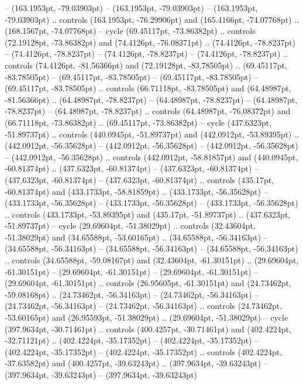  -- (163.1953pt, -79.03903pt)
 -- (163.1953pt, -79.03903pt)
 -- (163.1953pt, -79.03903pt) .. controls (163.1953pt, -76.29906pt) and (165.4166pt, -74.07768pt) .. (168.1567pt, -74.07768pt) -- cycle
(69.45117pt, -73.86382pt) .. controls (72.19128pt, -73.86382pt) and (74.4126pt, -76.08371pt) .. (74.4126pt, -78.8237pt)
 -- (74.4126pt, -78.8237pt)
 -- (74.4126pt, -78.8237pt)
 -- (74.4126pt, -78.8237pt) .. controls (74.4126pt, -81.56366pt) and (72.19128pt, -83.78505pt) .. (69.45117pt, -83.78505pt)
 -- (69.45117pt, -83.78505pt)
 -- (69.45117pt, -83.78505pt)
 -- (69.45117pt, -83.78505pt) .. controls (66.71118pt, -83.78505pt) and (64.48987pt, -81.56366pt) .. (64.48987pt, -78.8237pt)
 -- (64.48987pt, -78.8237pt)
 -- (64.48987pt, -78.8237pt)
 -- (64.48987pt, -78.8237pt) .. controls (64.48987pt, -76.08372pt) and (66.71118pt, -73.86382pt) .. (69.45117pt, -73.86382pt) -- cycle
(437.6323pt, -51.89737pt) .. controls (440.0945pt, -51.89737pt) and (442.0912pt, -53.89395pt) .. (442.0912pt, -56.35628pt)
 -- (442.0912pt, -56.35628pt)
 -- (442.0912pt, -56.35628pt)
 -- (442.0912pt, -56.35628pt) .. controls (442.0912pt, -58.81857pt) and (440.0945pt, -60.81374pt) .. (437.6323pt, -60.81374pt)
 -- (437.6323pt, -60.81374pt)
 -- (437.6323pt, -60.81374pt)
 -- (437.6323pt, -60.81374pt) .. controls (435.17pt, -60.81374pt) and (433.1733pt, -58.81859pt) .. (433.1733pt, -56.35628pt)
 -- (433.1733pt, -56.35628pt)
 -- (433.1733pt, -56.35628pt)
 -- (433.1733pt, -56.35628pt) .. controls (433.1733pt, -53.89395pt) and (435.17pt, -51.89737pt) .. (437.6323pt, -51.89737pt) -- cycle
(29.69604pt, -51.38029pt) .. controls (32.43604pt, -51.38029pt) and (34.65588pt, -53.60165pt) .. (34.65588pt, -56.34163pt)
 -- (34.65588pt, -56.34163pt)
 -- (34.65588pt, -56.34163pt)
 -- (34.65588pt, -56.34163pt) .. controls (34.65588pt, -59.08167pt) and (32.43604pt, -61.30151pt) .. (29.69604pt, -61.30151pt)
 -- (29.69604pt, -61.30151pt)
 -- (29.69604pt, -61.30151pt)
 -- (29.69604pt, -61.30151pt) .. controls (26.95605pt, -61.30151pt) and (24.73462pt, -59.08168pt) .. (24.73462pt, -56.34163pt)
 -- (24.73462pt, -56.34163pt)
 -- (24.73462pt, -56.34163pt)
 -- (24.73462pt, -56.34163pt) .. controls (24.73462pt, -53.60165pt) and (26.95593pt, -51.38029pt) .. (29.69604pt, -51.38029pt) -- cycle
(397.9634pt, -30.71461pt) .. controls (400.4257pt, -30.71461pt) and (402.4224pt, -32.71121pt) .. (402.4224pt, -35.17352pt)
 -- (402.4224pt, -35.17352pt)
 -- (402.4224pt, -35.17352pt)
 -- (402.4224pt, -35.17352pt) .. controls (402.4224pt, -37.63582pt) and (400.4257pt, -39.63243pt) .. (397.9634pt, -39.63243pt)
 -- (397.9634pt, -39.63243pt)
 -- (397.9634pt, -39.63243pt)
